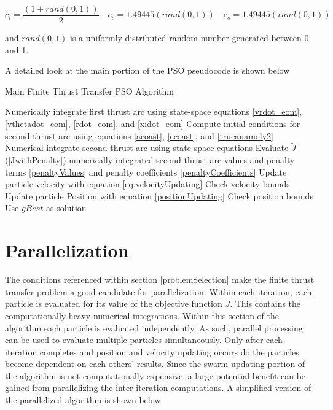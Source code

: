 \begin{equation}
    \label{eq:acceleratorCoefficients}
c_i = \dfrac{(1+rand(0,1))}{2} \quad c_c = 1.49445(rand(0,1)) \quad c_s = 1.49445(rand(0,1))
\end{equation}

\noindent and $rand(0,1)$ is a uniformly distributed random number generated between 0 and 1. \newline

\noindent A detailed look at the main portion of the PSO pseudocode is shown below

\begin{algorithm}[H]
    \caption{Main Finite Thrust Transfer PSO Algorithm}
    \begin{algorithmic}

    \STATE Numerically integrate first thrust arc using state-space equations \ref{vrdot_eom},
    \ref{vthetadot_eom}, \ref{rdot_eom}, and \ref{xidot_eom}
    \STATE Compute initial conditions for second thrust arc using equations \ref{acoast}, \ref{ecoast}, and \ref{trueanamoly2}
    \STATE Numerical integrate second thrust arc using state-space equations
    \STATE Evaluate $\tilde{J}$ (\ref{JwithPenalty}) numerically integrated second thrust arc values and penalty terms \ref{penaltyValues} and
    penalty coefficients \ref{penaltyCoefficients}
    \ENDFOR
    \STATE Update particle velocity with equation \ref{eq:velocityUpdating}
    \STATE Check velocity bounds
    \STATE Update particle Position with equation \ref{positionUpdating}
    \STATE Check position bounds
    \ENDFOR
    \ENDFOR
    \STATE Use $gBest$ as solution
    \end{algorithmic}
    \label{alg:PSOfThrustMain}

\end{algorithm}


\section{Parallelization}

\noindent The conditions referenced within section \ref{problemSelection} make the finite thrust transfer problem a good candidate for parallelization.
Within each iteration, each particle is evaluated for its value of the objective function $J$. This  contains the computationally heavy numerical integrations. Within this section of the algorithm each particle is evaluated independently. 
As such, parallel processing can be used to evaluate multiple particles simultaneously. Only after each iteration completes and position and velocity updating occurs do the particles become dependent on each others' results. Since 
the swarm updating portion of the algorithm is not computationally expensive, a large potential benefit can be gained from parallelizing the inter-iteration computations. A simplified version of the parallelized algorithm is shown below.

